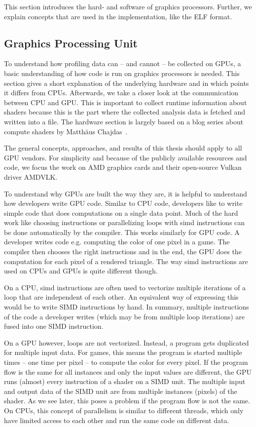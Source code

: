 \clearpage
{}
This section introduces the hard- and software of graphics processors.
Further, we explain concepts that are used in the implementation, like the ELF format.

\subsection{Graphics Processing Unit}
To understand how profiling data can -- and cannot -- be collected on GPUs, a basic understanding of how code is run on graphics processors is needed.
This section gives a short explanation of the underlying hardware and in which points it differs from CPUs.
Afterwards, we take a closer look at the communication between CPU and GPU. This is important to collect runtime information about shaders because this is the part where the collected analysis data is fetched and written into a file.
The hardware section is largely based on a blog series about compute shaders by Matthäus Chajdas~\cite{Chajdas2018}.

The general concepts, approaches, and results of this thesis should apply to all GPU vendors. For simplicity and because of the publicly available resources and code, we focus the work on AMD graphics cards and their open-source Vulkan driver AMDVLK.

To understand why GPUs are built the way they are, it is helpful to understand how developers write GPU code. Similar to CPU code, developers like to write simple code that does computations on a single data point. Much of the hard work like choosing instructions or parallelizing loops with \gls{simd} instructions can be done automatically by the compiler. This works similarly for GPU code. A developer writes code e.g. computing the color of one pixel in a game. The compiler then chooses the right instructions and in the end, the GPU does the computation for each pixel of a rendered triangle. The way \gls{simd} instructions are used on CPUs and GPUs is quite different though.

On a CPU, \gls{simd} instructions are often used to vectorize multiple iterations of a loop that are independent of each other. An equivalent way of expressing this would be to write SIMD instructions by hand. In summary, multiple instructions of the code a developer writes (which may be from multiple loop iterations) are fused into one SIMD instruction.

On a GPU however, loops are not vectorized. Instead, a program gets duplicated for multiple input data.
For games, this means the program is started multiple times -- one time per pixel -- to compute the color for every pixel.
If the program flow is the same for all instances and only the input values are different, the GPU runs (almost) every instruction of a shader on a SIMD unit.
The multiple input and output data of the SIMD unit are from multiple instances (pixels) of the shader.
As we see later, this poses a problem if the program flow is not the same.
On CPUs, this concept of parallelism is similar to different threads, which only have limited access to each other and run the same code on different data.

